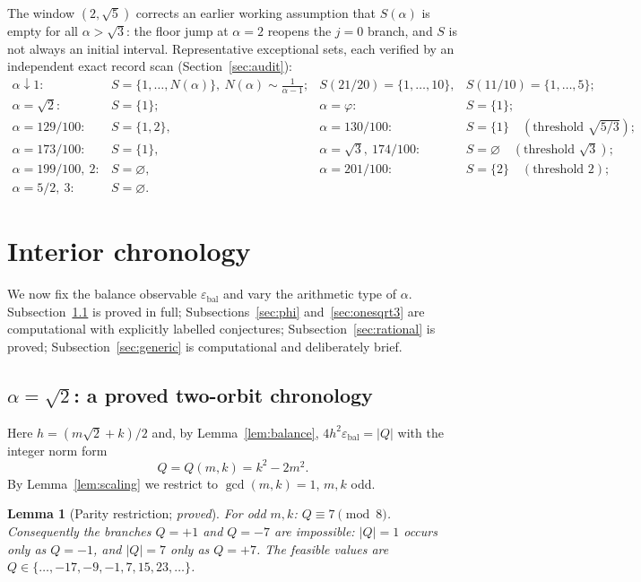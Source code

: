 \documentclass[11pt]{article}
\newtheorem{lemma}[theorem]{Lemma}
\theoremstyle{definition}
\theoremstyle{remark}
\newcommand{\eb}{\varepsilon_{\mathrm{bal}}}
\begin{document}
The window $(2,\sqrt5)$ corrects an earlier working assumption that $S(\alpha)$ is empty for all $\alpha>\sqrt3$: the floor jump at $\alpha=2$ reopens the $j=0$ branch, and $S$ is not always an initial interval. Representative exceptional sets, each verified by an independent exact record scan (Section~\ref{sec:audit}):
\[
\begin{array}{llll}
\alpha\downarrow1: & S=\{1,\dots,N(\alpha)\},\ N(\alpha)\sim\tfrac{1}{\alpha-1}; &
S(21/20)=\{1,\dots,10\}, & S(11/10)=\{1,\dots,5\};\\[2pt]
\alpha=\sqrt2: & S=\{1\}; & \alpha=\varphi: & S=\{1\};\\[2pt]
\alpha=129/100:& S=\{1,2\}, & \alpha=130/100: & S=\{1\}\quad(\text{threshold }\sqrt{5/3});\\[2pt]
\alpha=173/100:& S=\{1\}, & \alpha=\sqrt3,\ 174/100: & S=\varnothing\quad(\text{threshold }\sqrt3);\\[2pt]
\alpha=199/100,\ 2: & S=\varnothing, & \alpha=201/100: & S=\{2\}\quad(\text{threshold }2);\\[2pt]
\alpha=5/2,\ 3: & S=\varnothing. & &
\end{array}
\]

\section{Interior chronology}\label{sec:interior}

We now fix the balance observable $\eb$ and vary the arithmetic type of $\alpha$. Subsection~\ref{sec:sqrt2} is proved in full; Subsections~\ref{sec:phi} and~\ref{sec:onesqrt3} are computational with explicitly labelled conjectures; Subsection~\ref{sec:rational} is proved; Subsection~\ref{sec:generic} is computational and deliberately brief.

\subsection{$\alpha=\sqrt2$: a proved two-orbit chronology}\label{sec:sqrt2}

Here $h=(m\sqrt2+k)/2$ and, by Lemma~\ref{lem:balance}, $4h^2\eb=|Q|$ with the integer norm form
\[
Q=Q(m,k)=k^2-2m^2 .
\]
By Lemma~\ref{lem:scaling} we restrict to $\gcd(m,k)=1$, $m,k$ odd.

\begin{lemma}[Parity restriction; \emph{proved}]\label{lem:mod8}
For odd $m,k$: $Q\equiv7\pmod 8$. Consequently the branches $Q=+1$ and $Q=-7$ are impossible: $|Q|=1$ occurs only as $Q=-1$, and $|Q|=7$ only as $Q=+7$. The feasible values are $Q\in\{\dots,-17,-9,-1,7,15,23,\dots\}$.
\end{lemma}
\end{document}
